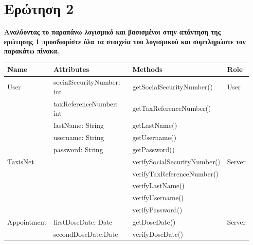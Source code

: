 \documentclass[12pt]{turabian-researchpaper}
\begin{document}
\section{Ερώτηση 2}
\textbf{Αναλύοντας το παραπάνω λογισμικό και βασισμένοι στην απάντηση της ερώτησης 1 προσδιορίστε όλα τα στοιχεία του λογισμικού και συμπληρώστε τον παρακάτω πίνακα.}

\begin{center}
    \begin{table}
        \centering
        \begin{tabular}{|l|l|l|l|}
            \hline
            \textbf{Name} & \textbf{Attributes}       & \textbf{Methods}             & \textbf{Role} \\ \hline
            User          & socialSecurityNumber: int & getSocialSecurityNumber()    & User          \\
                          & taxReferenceNumber: int   & getTaxReferenceNumber()      &               \\
                          & lastName: String          & getLastName()                &               \\ \hline
                          & username: String          & getUsername()                &               \\ \hline
                          & password: String          & getPassword()                &               \\ \hline
            TaxisNet      &                           & verifySocialSecurityNumber() & Server        \\
                          &                           & verifyTaxReferenceNumber()   &               \\
                          &                           & verifyLastName()             &               \\
                          &                           & verifyUsername()             &               \\
                          &                           & verifyPassword()             &               \\ \hline
            Appointment   & firstDoseDate: Date       & getDoseDate()                & Server        \\
                          & secondDoseDate:Date       & verifyDoseDate()             &               \\ \hline
        \end{tabular}
    \end{table}

\end{center}
\end{document}
